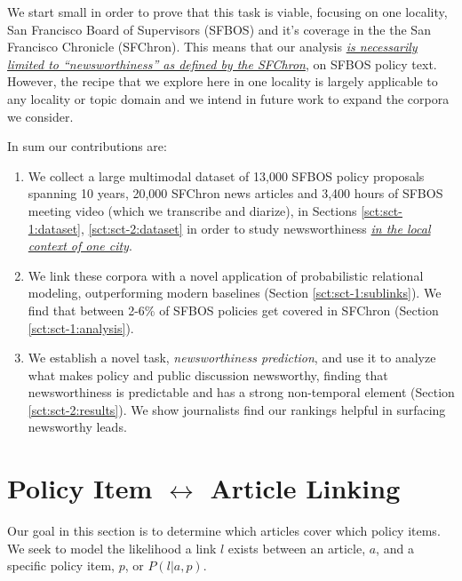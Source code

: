 \documentclass[11pt]{article}
\begin{document}
We start small in order to prove that this task is viable, focusing on one locality, San Francisco Board of Supervisors (SFBOS) and it's coverage in the the San Francisco Chronicle (SFChron). This means that our analysis \textit{\ul{is necessarily limited to ``newsworthiness'' as defined by the SFChron}}, on SFBOS policy text. However, the recipe that we explore here in one locality is largely applicable to any locality or topic domain and we intend in future work to expand the corpora we consider. %

In sum our contributions are:
\begin{enumerate}
    \item We collect a large multimodal dataset of 13,000 SFBOS policy proposals spanning 10 years, 20,000 SFChron news articles and 3,400 hours of SFBOS meeting video (which we transcribe and diarize), in Sections \ref{sct:sct-1:dataset}, \ref{sct:sct-2:dataset} in order to study newsworthiness \textit{\underline{in the local context of one city}}.
    
    \item We link these corpora with a novel application of probabilistic relational modeling, outperforming modern baselines (Section \ref{sct:sct-1:sublinks}). We find that between 2-6\% of SFBOS policies get covered in SFChron (Section \ref{sct:sct-1:analysis}).
    
    \item We establish a novel task, \textit{newsworthiness prediction}, and use it to analyze what makes policy and public discussion newsworthy, finding that newsworthiness is predictable and has a strong non-temporal element (Section \ref{sct:sct-2:results}). We show journalists find our rankings helpful in surfacing newsworthy leads.
\end{enumerate}

\section{Policy Item $\leftrightarrow$ Article Linking}
\label{sct:sct-1}

Our goal in this section is to determine which articles cover which policy items. We seek to model the likelihood a link $l$ exists between an article, $a$, and a specific policy item, $p$, or $P( l | a, p )$.
\end{document}
